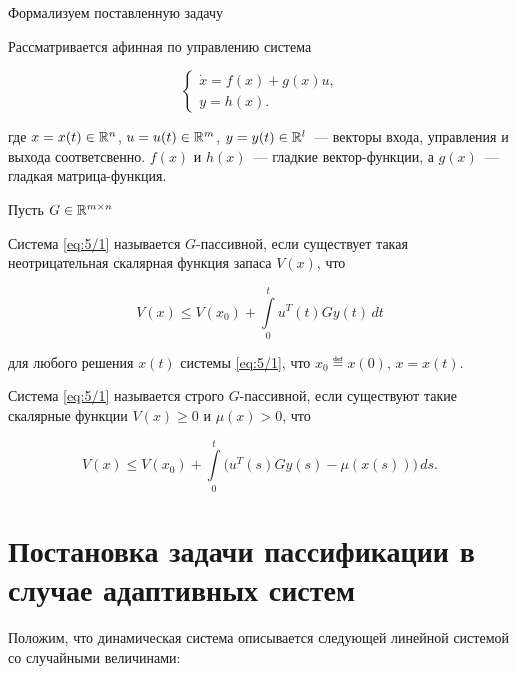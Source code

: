 Формализуем поставленную задачу\br

Рассматривается афинная по управлению система

\begin{equation}
\label{eq:5/1}
\left\{ \begin{array}{l}
\dot{x} = f(x) + g(x)u\mbox{,} \\
y = h(x)\mbox{.}
\end{array} \right.
\end{equation}

где $x = x(t) \in \mathbb{R}^{n}$, $u = u(t) \in \mathbb{R}^{m}$, $y = y(t) \in \mathbb{R}^{l}$~--- векторы входа, управления и выхода соответсвенно. $f(x)$ и $h(x)$~--- гладкие вектор-функции, а $g(x)$~--- гладкая матрица-функция.

Пусть $G \in \mathbb{R}^{m\times n}$

\begin{df}
\label{df:5/1}

Система \vref{eq:5/1} называется $G$-пассивной, если существует такая неотрицательная скалярная функция запаса $V(x)$, что

\begin{equation}
\label{eq:5/2}
V(x) \leqslant V(x_0) + \int\limits_0^t u^T(t)Gy(t)\,dt
\end{equation}


для любого решения $x(t)$ системы \ref{eq:5/1}, что $x_0 \eqdef x(0)$, $x=x(t)$.
\end{df}

\begin{df}
\label{df:5/2}

Система \vref{eq:5/1} называется строго $G$-пассивной, если существуют такие скалярные функции $V(x) \geqslant 0$ и $\mu(x) > 0$, что

\begin{equation}
\label{eq:5/3}
V(x) \leqslant V(x_0) + \int\limits_0^t \big( u^T(s)Gy(s) - \mu(x(s)) \big)\,ds\mbox{.}
\end{equation}

\end{df}



\section[Постановка задачи в случае адаптивных систем]{Постановка задачи пассификации в случае адаптивных систем}

Положим, что динамическая система описывается следующей линейной системой со случайными величинами:


